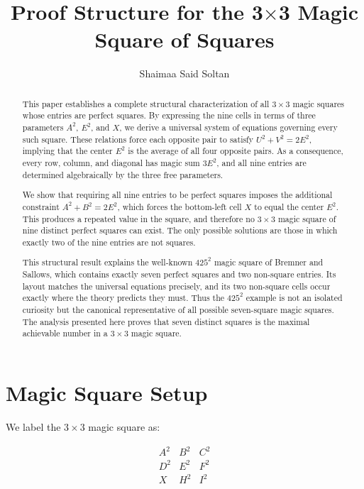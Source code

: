 \documentclass[12pt]{article}
\title{Proof Structure for the 3$\times$3 Magic Square of Squares}
\author{Shaimaa Said Soltan}
\date{}
\begin{document}
\maketitle
\begin{abstract}
This paper establishes a complete structural characterization of all
$3\times 3$ magic squares whose entries are perfect squares.  By expressing
the nine cells in terms of three parameters $A^2$, $E^2$, and $X$, we derive
a universal system of equations governing every such square.  These relations
force each opposite pair to satisfy $U^2 + V^2 = 2E^2$, implying that the
center $E^2$ is the average of all four opposite pairs.  As a consequence,
every row, column, and diagonal has magic sum $3E^2$, and all nine entries
are determined algebraically by the three free parameters.

We show that requiring all nine entries to be perfect squares imposes the
additional constraint $A^2 + B^2 = 2E^2$, which forces the bottom-left cell
$X$ to equal the center $E^2$.  This produces a repeated value in the square,
and therefore no $3\times 3$ magic square of nine distinct perfect squares
can exist.  The only possible solutions are those in which exactly two of the
nine entries are not squares.

This structural result explains the well-known $425^2$ magic square of
Bremner and Sallows, which contains exactly seven perfect squares and two
non-square entries.  Its layout matches the universal equations precisely,
and its two non-square cells occur exactly where the theory predicts they
must.  Thus the $425^2$ example is not an isolated curiosity but the canonical
representative of all possible seven-square magic squares.  The analysis
presented here proves that seven distinct squares is the maximal achievable
number in a $3\times 3$ magic square.
\end{abstract}

\section*{Magic Square Setup}

We label the $3\times 3$ magic square as:



\[
\begin{matrix}
A^2 & B^2 & C^2 \\
D^2 & E^2 & F^2 \\
 X &  H^2  & I^2
\end{matrix}
\]
\end{document}
